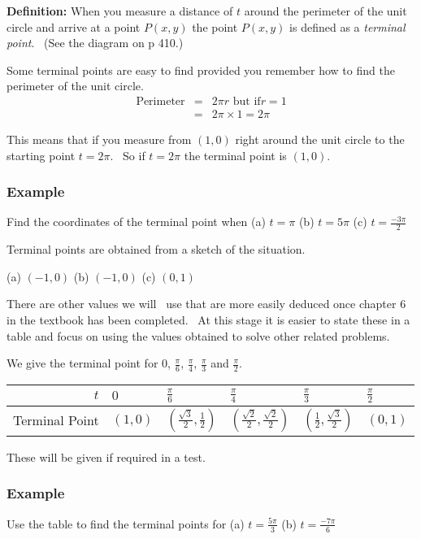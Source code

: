 \textbf{Definition:} When you measure a distance of $t$ around the perimeter of the unit circle and arrive at a point $P (x ,y)$ the point $P (x ,y)$ is defined as a \emph{terminal point}. \ (See the diagram on p 410.) 

Some terminal points are easy to find provided you remember how to find the perimeter of the unit circle.
\begin{eqnarray*}\text{Perimeter} &  = & 2 \pi  r\text{\ \ \ but if}r =1 \\
 &  = & 2 \pi  \times 1 =2 \pi \end{eqnarray*}

This means that if you measure from $\left (1 ,0\right )$ right around the unit circle to the starting point $t =2 \pi $. \ So if $t =2 \pi $ the terminal point is $\left (1 ,0\right )$. 

\subsubsection{Example}
Find the coordinates of the terminal point when (a) $t =\pi $ (b) $t =5 \pi $ (c) $t =\frac{ -3 \pi }{2}$ 

Terminal points are obtained from a sketch of the situation. 

(a) $\left ( -1 ,0\right )$ (b) $\left ( -1 ,0\right )$ (c) $\left (0 ,1\right )$ 

There are other values we will \ use
that are more easily deduced once chapter 6 in the textbook has been completed. \ At this stage it is easier to
state these in a table and focus on using the values obtained to solve other related problems. 

We give the terminal point for $0$, $\frac{\pi }{6}$, $\frac{\pi }{4}$, $\frac{\pi }{3}$ and $\frac{\pi }{2}$. 


\begin{tabular}[c]{|r|l|l|l|l|l|}\hline
$t$  & $0$  & $\frac{\pi }{6}$  & $\frac{\pi }{4}$  & $\frac{\pi }{3}$  & $\frac{\pi }{2}$  \\
\hline
Terminal Point  & $\left (1 ,0\right )$  & $\left (\frac{\sqrt{3}}{2} ,\frac{1}{2}\right )$  & $\left (\frac{\sqrt{2}}{2} ,\frac{\sqrt{2}}{2}\right )$  & $\left (\frac{1}{2} ,\frac{\sqrt{3}}{2}\right )$  & $\left (0 ,1\right )$  \\
\hline
\end{tabular}

These will be given if required in a test. 

\subsubsection{Example}
Use the table to find the terminal points for (a) $t =\frac{5 \pi }{3}$ (b) $t =\frac{ -7 \pi }{6}$ 

